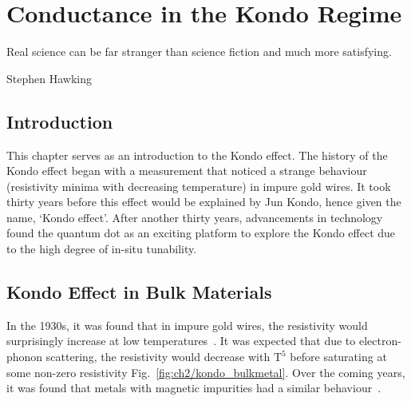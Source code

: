 \chapter{Conductance in the Kondo Regime}\label{cha:kondo_conductance}


\epigraph{Real science can be far stranger than science fiction and much more satisfying.}{Stephen Hawking}


\section{Introduction}
This chapter serves as an introduction to the Kondo effect. The history of the Kondo effect began with a measurement that noticed a strange behaviour (resistivity minima with decreasing temperature) in impure gold wires. It took thirty years before this effect would be explained by Jun Kondo, hence given the name, `Kondo effect'. After another thirty years, advancements in technology found the quantum dot as an exciting platform to explore the Kondo effect due to the high degree of in-situ tunability. 


\afterpage{\clearpage}
\section{Kondo Effect in Bulk Materials}


In the 1930s, it was found that in impure gold wires, the resistivity would surprisingly increase at low temperatures~\cite{de_haas}. It was expected that due to electron-phonon scattering, the resistivity would decrease with $\mathrm{T^5}$ before saturating at some non-zero resistivity Fig.~\ref{fig:ch2/kondo_bulkmetal}. Over the coming years, it was found that metals with magnetic impurities had a similar behaviour~\cite{still_irresistible}.


